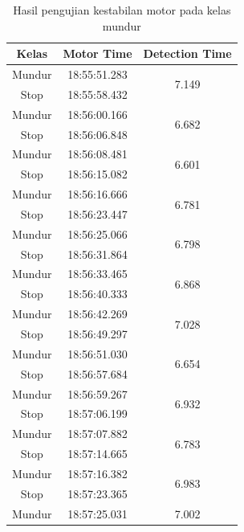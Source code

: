 \begin{longtable}{|c|c|c|}
  \caption{Hasil pengujian kestabilan motor pada kelas mundur} 
  \label{tb:motormundur} \\
  \hline
  \rowcolor[HTML]{C0C0C0} 
  \textbf{Kelas} & \textbf{Motor Time} & \textbf{Detection Time} \\ \hline
  Mundur & 18:55:51.283 & \multirow{2}{*}{7.149} \\ \cline{1-2}
  Stop   & 18:55:58.432 &                        \\ \hline
  Mundur & 18:56:00.166 & \multirow{2}{*}{6.682} \\ \cline{1-2}
  Stop   & 18:56:06.848 &                        \\ \hline
  Mundur & 18:56:08.481 & \multirow{2}{*}{6.601} \\ \cline{1-2}
  Stop   & 18:56:15.082 &                        \\ \hline
  Mundur & 18:56:16.666 & \multirow{2}{*}{6.781} \\ \cline{1-2}
  Stop   & 18:56:23.447 &                        \\ \hline
  Mundur & 18:56:25.066 & \multirow{2}{*}{6.798} \\ \cline{1-2}
  Stop   & 18:56:31.864 &                        \\ \hline
  Mundur & 18:56:33.465 & \multirow{2}{*}{6.868} \\ \cline{1-2}
  Stop   & 18:56:40.333 &                        \\ \hline
  Mundur & 18:56:42.269 & \multirow{2}{*}{7.028} \\ \cline{1-2}
  Stop   & 18:56:49.297 &                        \\ \hline
  Mundur & 18:56:51.030 & \multirow{2}{*}{6.654} \\ \cline{1-2}
  Stop   & 18:56:57.684 &                        \\ \hline
  Mundur & 18:56:59.267 & \multirow{2}{*}{6.932} \\ \cline{1-2}
  Stop   & 18:57:06.199 &                        \\ \hline
  Mundur & 18:57:07.882 & \multirow{2}{*}{6.783} \\ \cline{1-2}
  Stop   & 18:57:14.665 &                        \\ \hline
  Mundur & 18:57:16.382 & \multirow{2}{*}{6.983} \\ \cline{1-2}
  Stop   & 18:57:23.365 &                        \\ \hline
  Mundur & 18:57:25.031 & \multirow{2}{*}{7.002} \\ \cline{1-2}

\end{longtable}
